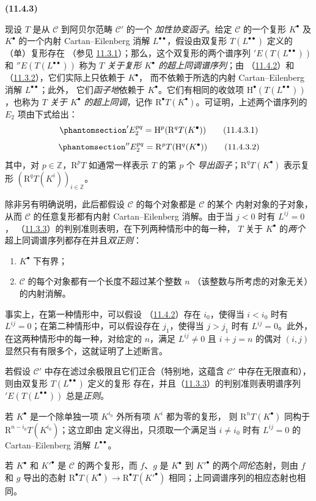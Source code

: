 \documentclass[UTF8,fontset=none,11pt,oneside,openany]{ctexbook}
\newenvironment{env}[1][]{%
  \par\medskip\noindent\textbf{(#1)}\ %
}{\par}
\newcommand{\oldpage}[2][]{%
  \hypertarget{ega-source-page-#1-#2}{}%
  \marginnote{\scriptsize\textbf{#1}~|~#2}\ignorespaces}
\let\EGAOriginalLabel\label
\renewcommand{\label}[1]{\phantomsection\EGAOriginalLabel{#1}}
\begin{document}
\begin{env}[11.4.3]
\label{0.11.4.3-fr}
现设 $T$ 是从 $\mathcal C$ 到阿贝尔范畴 $\mathcal C'$ 的一个
\emph{加性协变函子}。给定 $\mathcal C$ 的一个复形 $K^\bullet$ 及
$K^\bullet$ 的一个内射 Cartan--Eilenberg 消解 $L^{\bullet\bullet}$，假设由双复形
$T(L^{\bullet\bullet})$ 定义的（单）复形存在
（参见 \hyperref[0.11.3.1-fr]{11.3.1}）；那么，这个双复形的两个谱序列
$'E(T(L^{\bullet\bullet}))$ 和 $''E(T(L^{\bullet\bullet}))$ 称为
\emph{$T$ 关于复形 $K^\bullet$ 的超上同调谱序列}；由
（\hyperref[0.11.4.2-fr]{11.4.2}）和
（\hyperref[0.11.3.2-fr]{11.3.2}），它们实际上只依赖于 $K^\bullet$，
而不依赖于所选的内射 Cartan--Eilenberg 消解 $L^{\bullet\bullet}$；此外，
它们\emph{函子地}依赖于 $K^\bullet$。它们有相同的收敛项
$\mathrm H^\bullet(T(L^{\bullet\bullet}))$，也称为
\emph{$T$ 关于 $K^\bullet$ 的超上同调}，记作
$\mathrm R^\bullet T(K^\bullet)$。可证明，上述两个谱序列的 $E_2$ 项由下式给出：
\[
  \label{0.11.4.3.1-fr}
  'E_2^{pq}=\mathrm H^p(\mathrm R^qT(K^\bullet))
  \tag{11.4.3.1}
\]
\[
  \label{0.11.4.3.2-fr}
  ''E_2^{pq}=\mathrm R^pT(\mathrm H^q(K^\bullet))
  \tag{11.4.3.2}
\]
\oldpage[0\textsubscript{III}]{34}
其中，对 $p\in\mathbb Z$，$\mathrm R^pT$ 如通常一样表示 $T$ 的第 $p$ 个
\emph{导出函子}；$\mathrm R^qT(K^\bullet)$ 表示复形
$(\mathrm R^qT(K^i))_{i\in\mathbb Z}$。

\label{0.11.4.4-fr}
除非另有明确说明，此后都假设 $\mathcal C$ 的每个对象都是 $\mathcal C$ 的某个
内射对象的子对象，从而 $\mathcal C$ 的任意复形都有内射 Cartan--Eilenberg
消解。由于当 $j<0$ 时有 $L^{ij}=0$，
（\hyperref[0.11.3.3-fr]{11.3.3}）的判别准则表明，在下列两种情形中的每一种，
$T$ 关于 $K^\bullet$ 的\emph{两个}超上同调谱序列都存在并且\emph{双正则}：
\begin{enumerate}
  \item[$1^\circ$] $K^\bullet$ 下有界；
  \item[$2^\circ$] $\mathcal C$ 的每个对象都有一个长度不超过某个整数 $n$
    （该整数与所考虑的对象无关）的内射消解。
\end{enumerate}
事实上，在第一种情形中，可以假设
（\hyperref[0.11.4.2-fr]{11.4.2}）存在 $i_0$，使得当 $i<i_0$ 时有
$L^{ij}=0$；在第二种情形中，可以假设存在 $j_1$，使得当 $j>j_1$ 时有
$L^{ij}=0$。此外，在这两种情形中的每一种，对给定的 $n$，满足
$L^{ij}\neq0$ 且 $i+j=n$ 的偶对 $(i,j)$ 显然只有有限多个，这就证明了上述断言。

若假设 $\mathcal C'$ 中存在滤过余极限且它们正合（特别地，这蕴含
$\mathcal C'$ 中存在无限直和），则由双复形 $T(L^{\bullet\bullet})$ 定义的复形
存在，并且（\hyperref[0.11.3.3-fr]{11.3.3}）的判别准则表明谱序列
$'E(T(L^{\bullet\bullet}))$ 总是\emph{正则}。

若 $K^\bullet$ 是一个除单独一项 $K^{i_0}$ 外所有项 $K^i$ 都为零的复形，
则 $\mathrm R^nT(K^\bullet)$ 同构于 $\mathrm R^{n-i_0}T(K^{i_0})$；这立即由
定义得出，只须取一个满足当 $i\neq i_0$ 时有 $L^{ij}=0$ 的
Cartan--Eilenberg 消解 $L^{\bullet\bullet}$。

若 $K^\bullet$ 和 $K'^\bullet$ 是 $\mathcal C$ 的两个复形，而 $f$、$g$ 是
$K^\bullet$ 到 $K'^\bullet$ 的两个\emph{同伦}态射，则由 $f$ 和 $g$ 导出的态射
$\mathrm R^\bullet T(K^\bullet)\to
\mathrm R^\bullet T(K'^\bullet)$ 相同；上同调谱序列的相应态射也相同。
\end{env}
\end{document}

